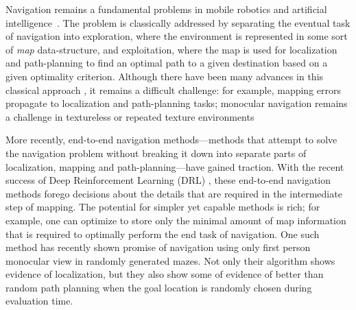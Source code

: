 
Navigation remains a fundamental problems in mobile robotics and artificial intelligence~\cite{SmChIJRR1986,ElCOMPUTER1980}.
The problem is classically addressed by separating the eventual task of navigation into exploration, where the environment is represented in some sort of \emph{map} data-structure, and exploitation, where the map is used for localization and path-planning to find an optimal path to a given destination based on a given optimality criterion.  Although there have been many advances in this classical approach \cite{RaMoTaTROB2015,EnScCrECCV2014}, it remains a difficult challenge: for example, mapping errors propagate to localization and path-planning tasks; monocular navigation remains a challenge in textureless \cite{YaSoKaIROS2016} or repeated texture environments 

More recently, end-to-end navigation methods---methods that attempt to  
solve the navigation problem without breaking it down into separate parts of localization, mapping and path-planning---have gained traction.
%
With the recent success of Deep Reinforcement Learning (DRL) \cite{MnKaSiNATURE2015}, these end-to-end navigation methods \cite{MnBaMiICML2016,SiHuMaNATURE2016,LePaKrISER2017,MiPaViICLR2017,OhChSiICML2016} forego decisions about the details that are required in the intermediate step of mapping.
The potential for simpler yet capable methods is rich; for example, one can optimize to store only the minimal amount of map information that is required to optimally perform the end task of navigation.
One such method \cite{MiPaViICLR2017} has recently shown promise of navigation using only first person monocular view in randomly generated mazes. Not only their algorithm shows evidence of localization, but they also show some of evidence of better than random path planning when the goal location is randomly chosen during evaluation time. 

